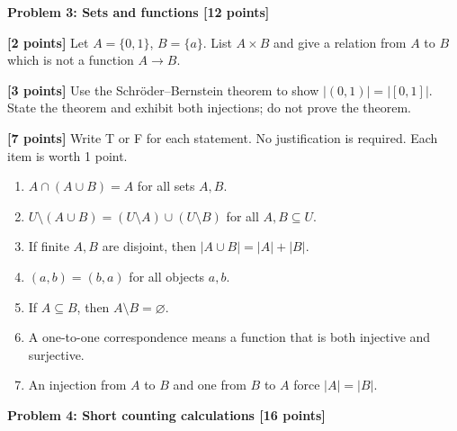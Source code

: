 \documentclass[12pt,letterpaper]{article}
\newcommand{\problemheading}[2][5\baselineskip]{\Needspace{#1}\par\noindent\hspace*{-0.625in}\textbf{#2}\par\nobreak\vspace{0.3em}}
\newcommand{\examspace}[1]{\par\vspace*{#1cm}}
\begin{document}
\clearpage
\vspace*{0.21in}
\problemheading{Problem 3: Sets and functions [12 points]}
\begin{list}{}{\setlength{\leftmargin}{0.25in}\setlength{\rightmargin}{0.25in}}\item[]
\begin{description}[font=\normalfont,leftmargin=1.2em,labelsep=0.4em]
\item[(a)] \textbf{[2 points]} Let $A=\{0,1\}$, $B=\{a\}$. List $A\times B$ and give a relation from $A$ to $B$ which is not a function $A\to B$.
\examspace{3}
\Needspace{\dimexpr 4cm+4\baselineskip\relax}
\item[(b)] \textbf{[3 points]} Use the Schr\"oder--Bernstein theorem to show $|(0,1)|=|[0,1]|$. State the theorem and exhibit both injections; do not prove the theorem.
\examspace{4}
\Needspace{\dimexpr 1cm+4\baselineskip\relax}
\item[(c)] \textbf{[7 points]} Write T or F for each statement. No justification is required. Each item is worth 1 point.\begin{enumerate}[label=(\roman*)]\item $A\cap(A\cup B)=A$ for all sets $A,B$.\item $U\setminus(A\cup B)=(U\setminus A)\cup(U\setminus B)$ for all $A,B\subseteq U$.\item If finite $A,B$ are disjoint, then $|A\cup B|=|A|+|B|$.\item $(a,b)=(b,a)$ for all objects $a,b$.\item If $A\subseteq B$, then $A\setminus B=\varnothing$.\item A one-to-one correspondence means a function that is both injective and surjective.\item An injection from $A$ to $B$ and one from $B$ to $A$ force $|A|=|B|$.\end{enumerate}
\examspace{1}
\end{description}
\end{list}
\clearpage
\vspace*{0.21in}
\problemheading{Problem 4: Short counting calculations [16 points]}
\end{document}
